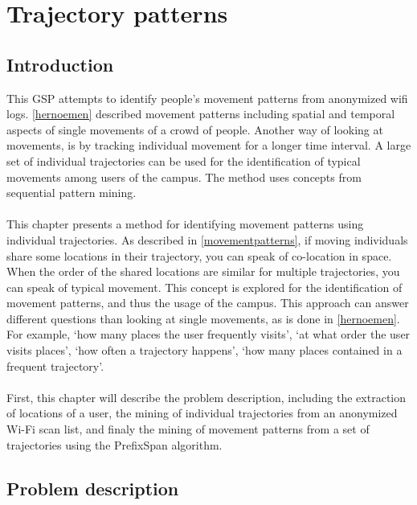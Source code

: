 \chapter{Trajectory patterns}\label{trajectories}
\section{Introduction}
This GSP attempts to identify people’s movement patterns from anonymized wifi logs. \autoref{hernoemen} described movement patterns including spatial and temporal aspects of single movements of a crowd of people. Another way of looking at movements, is by tracking individual movement for a longer time interval. A large set of individual trajectories can be used for the identification of typical movements among users of the campus. The method uses concepts from sequential pattern mining. \\\\
This chapter presents a method for identifying movement patterns using individual trajectories. As described in \autoref{movementpatterns}, if moving individuals share some locations in their trajectory, you can speak of co-location in space. When the order of the shared locations are similar for multiple trajectories, you can speak of typical movement. This concept is explored for the identification of movement patterns, and thus the usage of the campus. This approach can answer different questions than looking at single movements, as is done in \autoref{hernoemen}. For example, ‘how many places the user frequently visits’, ‘at what order the user visits places’, ‘how often a trajectory happens’, ‘how many places contained in a frequent trajectory’.\\\\
First, this chapter will describe the problem description, including the extraction of locations of a user, the mining of individual trajectories from an anonymized Wi-Fi scan list, and finaly the mining of movement patterns from a set of trajectories using the PrefixSpan algorithm.
\section{Problem description}
